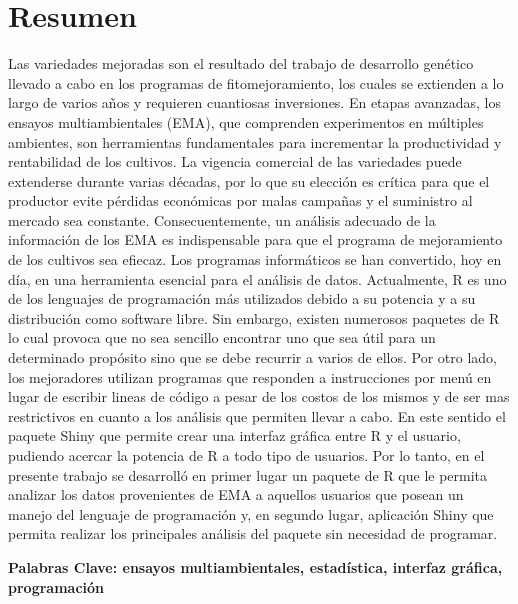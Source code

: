 
\chapter*{Resumen}

Las variedades mejoradas son el resultado del trabajo de desarrollo genético llevado a cabo en los programas de fitomejoramiento, los cuales se extienden a lo largo de varios años y requieren cuantiosas inversiones. En etapas avanzadas, los ensayos multiambientales (EMA), que comprenden experimentos en múltiples ambientes, son herramientas fundamentales para incrementar la productividad y rentabilidad de los cultivos. La vigencia comercial de las variedades puede extenderse durante varias décadas, por lo que su elección es crítica para que el productor evite pérdidas económicas por malas campañas y el suministro al mercado sea constante. Consecuentemente, un análisis adecuado de la información de los EMA es indispensable para que el programa de mejoramiento de los cultivos sea efiecaz. Los programas informáticos se han convertido, hoy en día, en una herramienta esencial para el análisis de datos. Actualmente, R es uno de los lenguajes de programación más utilizados debido a su potencia y a su distribución como software libre. Sin embargo, existen numerosos paquetes de R lo cual provoca que no sea sencillo encontrar uno que sea útil para un determinado propósito sino que se debe recurrir a varios de ellos. Por otro lado, los mejoradores  utilizan programas que responden a instrucciones por menú en lugar de escribir lineas de código a pesar de los costos de los mismos y de ser mas restrictivos en cuanto a los análisis que permiten llevar a cabo. En este sentido el paquete Shiny que permite crear una interfaz gráfica entre R y el usuario, pudiendo acercar la potencia de R a todo tipo de usuarios. Por lo tanto, en el presente trabajo se desarrolló en primer lugar un paquete de R que le permita analizar los datos provenientes de EMA a aquellos usuarios que posean un manejo del lenguaje de programación y, en segundo lugar, aplicación Shiny que permita realizar los principales análisis del paquete sin necesidad de programar.

\textbf{Palabras Clave: ensayos multiambientales, estadística, interfaz gráfica, programación}

